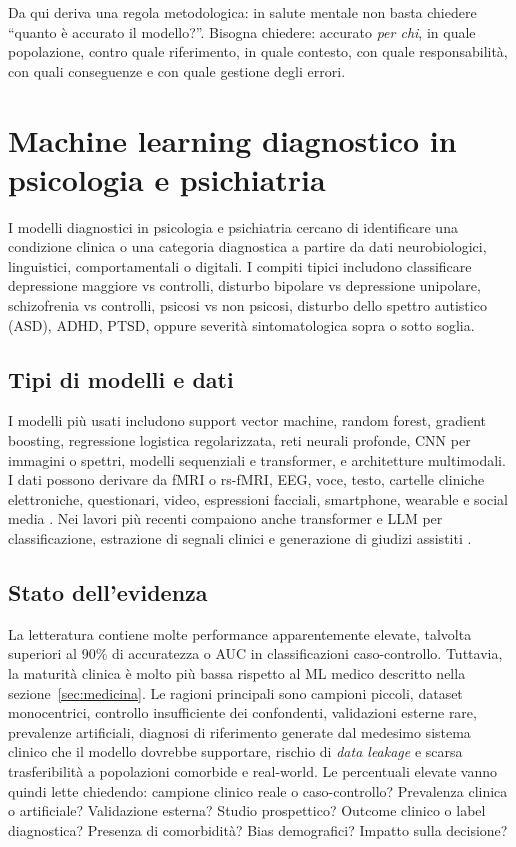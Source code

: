 \documentclass[11pt,a4paper]{article}
\begin{document}
Da qui deriva una regola metodologica: in salute mentale non basta chiedere ``quanto è accurato il modello?''. Bisogna chiedere: accurato \emph{per chi}, in quale popolazione, contro quale riferimento, in quale contesto, con quale responsabilità, con quali conseguenze e con quale gestione degli errori.

\section{Machine learning diagnostico in psicologia e psichiatria}
\label{sec:mldiag}

I modelli diagnostici in psicologia e psichiatria cercano di identificare una condizione clinica o una categoria diagnostica a partire da dati neurobiologici, linguistici, comportamentali o digitali. I compiti tipici includono classificare depressione maggiore vs controlli, disturbo bipolare vs depressione unipolare, schizofrenia vs controlli, psicosi vs non psicosi, disturbo dello spettro autistico (ASD), ADHD, PTSD, oppure severità sintomatologica sopra o sotto soglia.

\subsection{Tipi di modelli e dati}

I modelli più usati includono support vector machine, random forest, gradient boosting, regressione logistica regolarizzata, reti neurali profonde, CNN per immagini o spettri, modelli sequenziali e transformer, e architetture multimodali. I dati possono derivare da fMRI o rs-fMRI, EEG, voce, testo, cartelle cliniche elettroniche, questionari, video, espressioni facciali, smartphone, wearable e social media \cite{koutsouleris2021,guo2024}. Nei lavori più recenti compaiono anche transformer e LLM per classificazione, estrazione di segnali clinici e generazione di giudizi assistiti \cite{hua2025}.

\subsection{Stato dell'evidenza}

La letteratura contiene molte performance apparentemente elevate, talvolta superiori al 90\% di accuratezza o AUC in classificazioni caso-controllo. Tuttavia, la maturità clinica è molto più bassa rispetto al ML medico descritto nella sezione~\ref{sec:medicina}. Le ragioni principali sono campioni piccoli, dataset monocentrici, controllo insufficiente dei confondenti, validazioni esterne rare, prevalenze artificiali, diagnosi di riferimento generate dal medesimo sistema clinico che il modello dovrebbe supportare, rischio di \emph{data leakage} e scarsa trasferibilità a popolazioni comorbide e real-world. Le percentuali elevate vanno quindi lette chiedendo: campione clinico reale o caso-controllo? Prevalenza clinica o artificiale? Validazione esterna? Studio prospettico? Outcome clinico o label diagnostica? Presenza di comorbidità? Bias demografici? Impatto sulla decisione?
\end{document}
